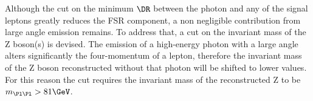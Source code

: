 \label{sec:FSR_cut}
Although the cut on the minimum $\DR$ between the photon and any of the signal leptons greatly reduces the FSR component,
a non negligible contribution from large angle emission remains.
To address that, a cut on the invariant mass of the Z boson(s) is devised.
The emission of a high-energy photon with a large angle alters significantly the four-momentum of a lepton,
therefore the invariant mass of the Z boson reconstructed without that photon will be shifted to lower values.
For this reason the cut requires
the invariant mass of the reconstructed Z to be $m_{\Pl \Pl} > 81 \GeV$.


